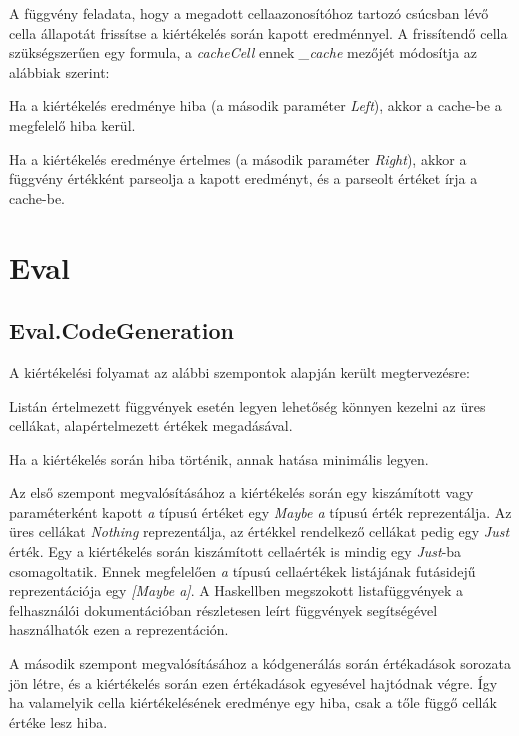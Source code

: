 A függvény feladata, hogy a megadott cellaazonosítóhoz tartozó csúcsban lévő cella állapotát frissítse a kiértékelés során kapott eredménnyel. A frissítendő cella szükségszerűen egy formula, a \textit{cacheCell} ennek \textit{\_cache} mezőjét módosítja az alábbiak szerint:

\begin{compactenum}
	\item Ha a kiértékelés eredménye hiba (a második paraméter \textit{Left}), akkor a cache-be a megfelelő hiba kerül.
	\item Ha a kiértékelés eredménye értelmes (a második paraméter \textit{Right}), akkor a függvény értékként parseolja a kapott eredményt, és a parseolt értéket írja a cache-be.
\end{compactenum}

\section{Eval}

\subsection{Eval.CodeGeneration}

A kiértékelési folyamat az alábbi szempontok alapján került megtervezésre:
\begin{compactenum}
	\item Listán értelmezett függvények esetén legyen lehetőség könnyen kezelni az üres cellákat, alapértelmezett értékek megadásával.
	\item Ha a kiértékelés során hiba történik, annak hatása minimális legyen.
\end{compactenum}

Az első szempont megvalósításához a kiértékelés során egy kiszámított vagy paraméterként kapott \textit{a} típusú értéket egy \textit{Maybe a} típusú érték reprezentálja. Az üres cellákat \textit{Nothing} reprezentálja, az értékkel rendelkező cellákat pedig egy \textit{Just} érték. Egy a kiértékelés során kiszámított cellaérték is mindig egy \textit{Just}-ba csomagoltatik. Ennek megfelelően \textit{a} típusú cellaértékek listájának futásidejű reprezentációja egy \textit{[Maybe a]}. A Haskellben megszokott listafüggvények a felhasználói dokumentációban részletesen leírt függvények segítségével használhatók ezen a reprezentáción.

A második szempont megvalósításához a kódgenerálás során értékadások sorozata jön létre, és a kiértékelés során ezen értékadások egyesével hajtódnak végre. Így ha valamelyik cella kiértékelésének eredménye egy hiba, csak a tőle függő cellák értéke lesz hiba. 

